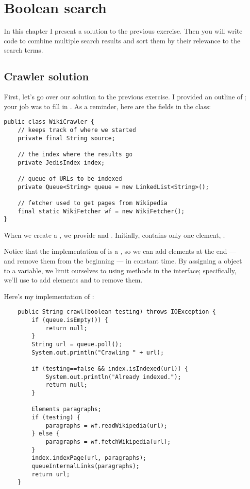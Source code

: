 \documentclass[12pt]{book}
\theoremstyle{exercise}
\begin{document}
\chapter{Boolean search}

In this chapter I present a solution to the previous exercise. Then
you will write code to combine multiple search results and sort them
by their relevance to the search terms.


\section{Crawler solution}
\label{crawler-solution}

First, let's go over our solution to the previous exercise. I provided an
outline of ; your job was to fill in .
As a reminder, here are the fields in the  class:


\begin{verbatim}
public class WikiCrawler {
    // keeps track of where we started
    private final String source;

    // the index where the results go
    private JedisIndex index;

    // queue of URLs to be indexed
    private Queue<String> queue = new LinkedList<String>();

    // fetcher used to get pages from Wikipedia
    final static WikiFetcher wf = new WikiFetcher();
}
\end{verbatim}

When we create a , we provide  and
. Initially,  contains only one element,
.


Notice that the implementation of  is a
, so we can add elements at the end --- and remove
them from the beginning --- in constant time. By assigning a
 object to a  variable, we limit
ourselves to using methods in the  interface; specifically,
we'll use  to add elements and  to remove
them.


Here's my implementation of :

\begin{verbatim}
    public String crawl(boolean testing) throws IOException {
        if (queue.isEmpty()) {
            return null;
        }
        String url = queue.poll();
        System.out.println("Crawling " + url);

        if (testing==false && index.isIndexed(url)) {
            System.out.println("Already indexed.");
            return null;
        }

        Elements paragraphs;
        if (testing) {
            paragraphs = wf.readWikipedia(url);
        } else {
            paragraphs = wf.fetchWikipedia(url);
        }
        index.indexPage(url, paragraphs);
        queueInternalLinks(paragraphs);
        return url;
    }
\end{verbatim}
\end{document}
